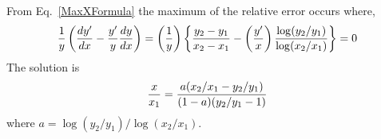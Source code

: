 From Eq.~\ref{MaxXFormula} the maximum of the relative error occurs where,
\begin{equation}
    { 1 \over y } \left( {dy' \over dx } - {y' \over y} { dy \over dx } \right) = \left({ 1 \over y }\right) \left\{
        { y_2 - y_1 \over x_2 - x_1 } - \left({y' \over x}\right) {\log(y_2/y_1) \over \log(x_2/x_1)} \right\} = 0
\end{equation}
The solution is
\begin{equation}
    { x \over x_1 } = { a ( x_2 / x_1 - y_2 / y_1 ) \over ( 1 - a ) ( y_2 / y_1 - 1 ) }
\end{equation}
where $a = \log(y_2/y_1) / \log(x_2/x_1)$.
